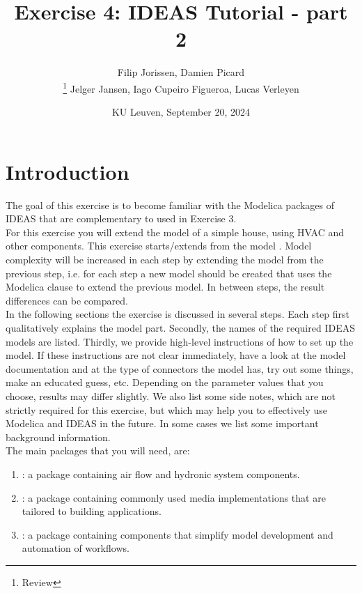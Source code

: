 \documentclass[10pt,a4paper]{article}
\begin{document}
\title{Exercise 4: IDEAS Tutorial - part 2}
\author{Filip Jorissen, Damien Picard\\ \thanks{Review} Jelger Jansen, Iago Cupeiro Figueroa, Lucas Verleyen}
\date{KU Leuven, September 20, 2024}
\maketitle

\doclicenseThis

\section*{Introduction}
The goal of this exercise is to become familiar with the 
Modelica packages of IDEAS that are
complementary to  used in Exercise 3. \\

For this exercise you will extend the model of a simple house,
using HVAC and other components.
This exercise starts/extends from the model . 
Model complexity will be increased in each step by 
extending the model from the previous step, i.e. for each step a new model should be created that uses
the Modelica  clause to extend the previous model.
In between steps, the result differences can be compared.\\

In the following sections the exercise is discussed 
in several steps. 
Each step first qualitatively explains the model part.
Secondly, the names of the required IDEAS models 
are listed.
Thirdly, we provide high-level instructions of how to
set up the model.
If these instructions are not clear immediately, 
have a look at the model documentation and at the type of
connectors the model has, 
try out some things, 
make an educated guess, etc.
Depending on the parameter values that you choose, results
may differ slightly.
We also list some side notes, which are not strictly required for this
exercise, but which may help you to effectively use Modelica
and IDEAS in the future.
In some cases we list some important background information.\\

The main packages that you will need, are:
\begin{enumerate}
\item {}: a package containing air flow and hydronic system components.
\item {}: a package containing commonly used media implementations that are tailored to building applications.
\item {}: a package containing components that simplify model development and automation of workflows.
\end{enumerate}
\end{document}
